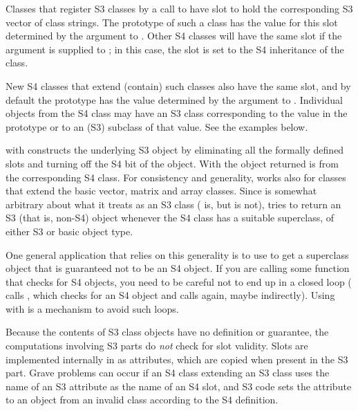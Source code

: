\begin{Details}\relax
Classes that register S3 classes by a call to
 have slot  to hold
the corresponding S3 vector of class strings.
The prototype of such
a class has the value for this slot determined  by the argument to
.
Other S4 classes will have the same slot if the argument
 is supplied to ; in
this case, the slot is set to the S4 inheritance of the class.

New S4 classes that extend (contain) such
classes also have the same slot, and by default the prototype has
the value determined  by the  argument to
.
Individual objects from the S4 class may
have 
an S3 class corresponding to the value in the prototype or to an
(S3) subclass of that value.  See the examples below.

  with  constructs the underlying S3 object by eliminating
all the formally defined slots and turning off the S4 bit of the
object.  With   the object returned is from
the corresponding S4 class.  For consistency and generality,
 works also for classes that extend the basic vector,
matrix and array classes.  Since \R{} is somewhat arbitrary about what
it treats as an S3 class ( is, but  is
not),  tries to return an S3 (that is, non-S4) object
whenever the S4 class has a suitable superclass, of either S3 or
basic object type.

One general application that relies on this generality is to use
 to get a superclass object that is guaranteed not to
be an S4 object.  If you are calling some function that checks for
S4 objects, you need to be careful not to end up in a closed loop
( calls , which checks for an S4 object and
calls  again, maybe indirectly).  Using 
with  is a mechanism to avoid such loops.


Because the contents of S3 class objects have no definition or
guarantee, the computations involving S3 parts  do
\emph{not} check for slot validity.  Slots are implemented
internally in \R{} as attributes, which are copied when present in the
S3 part.  Grave problems can occur if an S4 class
extending an S3 class uses the name of an S3 attribute as the name
of an S4 slot, and S3 code sets the attribute to an object from an
invalid class according to the S4 definition.


\end{Details}
